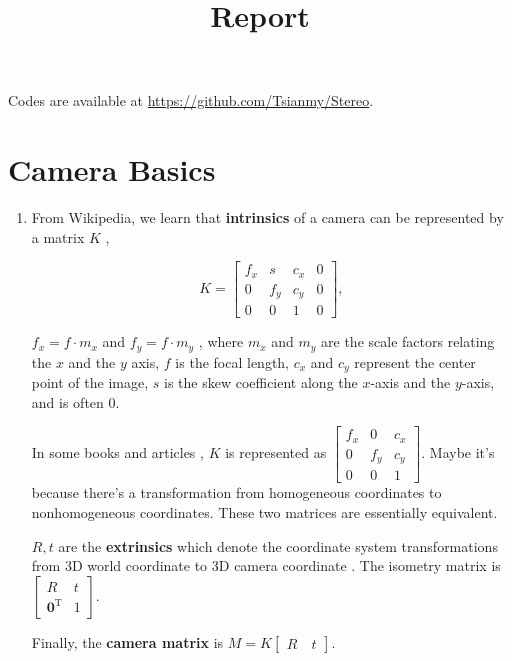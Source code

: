 \documentclass{article}
\title{Report}
\date{}
\begin{document}
\maketitle

Codes are available at \url{https://github.com/Tsianmy/Stereo}.

\section*{Camera Basics}
\begin{enumerate}

\item From Wikipedia, we learn that \textbf{intrinsics} of a camera can be represented by a matrix $K$ \cite{ref1}, 

$$
K =
\begin{bmatrix}
f_x & s & c_x & 0 \\
0 & f_y & c_y & 0 \\
0 & 0 & 1 & 0
\end{bmatrix},
$$

$f_x = f \cdot m_x$ and $f_y = f \cdot m_y$ , where $m_x$ and $m_y$ are the scale factors relating the $x$ and the $y$ axis, $f$ is the focal length, $c_x$ and $c_y$ represent the center point of the image, $s$ is the skew coefficient along the $x$-axis and the $y$-axis, and is often $0$.

In some books and articles \cite{ref2}\cite{ref3}, $K$ is represented as $\begin{bmatrix} f_x & 0 & c_x \\ 0 & f_y & c_y \\ 0 & 0 & 1 \end{bmatrix}$. Maybe it's because there's a transformation from homogeneous coordinates to nonhomogeneous coordinates. These two matrices are essentially equivalent.

$R, t$ are the \textbf{extrinsics} which denote the coordinate system transformations from 3D world coordinate to 3D camera coordinate \cite{ref1}. The isometry matrix is $\begin{bmatrix} R & t \\ \boldsymbol 0^\mathrm T & 1 \end{bmatrix}$.

Finally, the \textbf{camera matrix} is $M = K \begin{bmatrix} R \quad t \end{bmatrix}$.


\end{enumerate}
\end{document}
